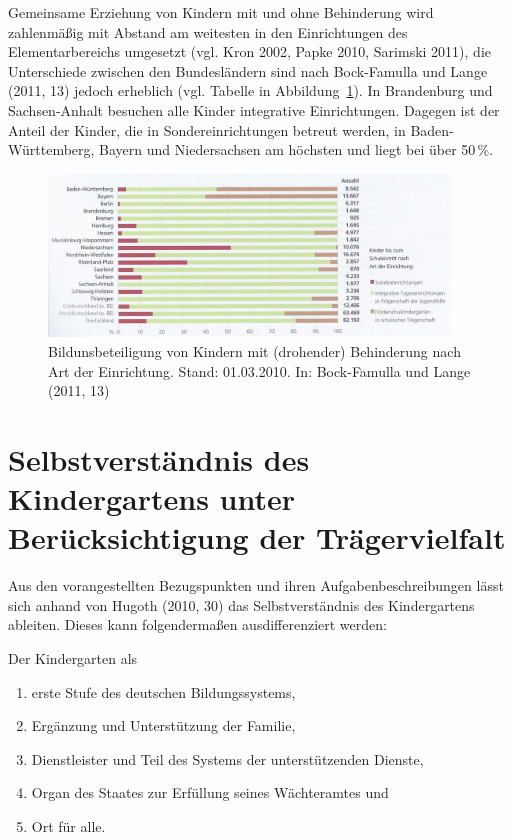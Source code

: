Gemeinsame Erziehung von Kindern mit und ohne Behinderung wird zahlenmäßig mit Abstand am weitesten in den Einrichtungen des Elementarbereichs umgesetzt (vgl. Kron 2002, Papke 2010, Sarimski 2011), die Unterschiede zwischen den Bundesländern sind nach Bock-Famulla und Lange (2011, 13) jedoch erheblich (vgl. Tabelle in Abbildung~\ref{bild:bildungsbeteiligung}). In Brandenburg und Sachsen-Anhalt besuchen alle Kinder integrative Einrichtungen. Dagegen ist der Anteil der Kinder, die in Sondereinrichtungen betreut werden, in Baden-Württemberg, Bayern und Niedersachsen am höchsten und liegt bei über 50\,\%. 
\begin{figure}
  \centering
  \includegraphics[width=0.95\textwidth]{bilder/bildungsbeteiligung}
  \caption{Bildunsbeteiligung von Kindern mit (drohender) Behinderung nach Art der Einrichtung. Stand: 01.03.2010. In: Bock-Famulla und Lange (2011, 13)}
  \label{bild:bildungsbeteiligung}
\end{figure}


\section{Selbstverständnis des Kindergartens unter Berücksichtigung der Trägervielfalt}\label{sec:kitaSelbst}
Aus den vorangestellten Bezugspunkten und ihren Aufgabenbeschreibungen lässt sich anhand von Hugoth (2010, 30) das Selbstverständnis des Kindergartens ableiten. Dieses kann folgendermaßen ausdifferenziert werden:

Der Kindergarten als
\begin{enumerate}
\item erste Stufe des deutschen Bildungssystems,
\item Ergänzung und Unterstützung der Familie,
\item Dienstleister und Teil des Systems der unterstützenden Dienste,
\item Organ des Staates zur Erfüllung seines Wächteramtes und 
\item Ort für alle.
\end{enumerate}

